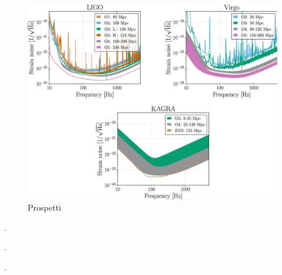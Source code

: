 



\begin{center}
	\begin{figure}[ht]
		\centering
		\includegraphics[scale=0.25, angle=0]{figures/Capitolo_3/noiseO4.pdf}
		\setlength{\belowcaptionskip}{-20pt}
		\caption{Prospetti \cite{Abbott_2020a}}
		\label{fig:noiseO4}
	\end{figure}
\end{center}

\lipsum[3]\cite{Abbott_2017a}.

\lipsum[4]\cite{Klimenko_2008}.

\lipsum[6]\cite{Klimenko_2016}.